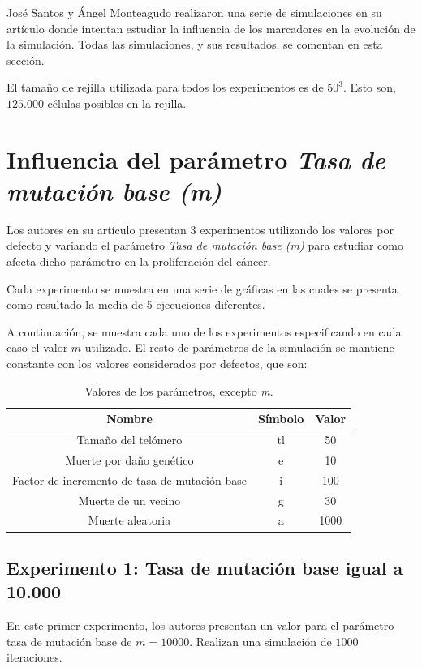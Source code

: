 José Santos y Ángel Monteagudo realizaron una serie de simulaciones en su artículo
donde intentan estudiar la influencia de los marcadores en la evolución de la simulación.
Todas las simulaciones, y sus resultados, se comentan en esta sección.

El tamaño de rejilla utilizada para todos los experimentos es de $50^3$. Esto son,
$125.000$ células posibles en la rejilla.

\section{Influencia del parámetro \textit{Tasa de mutación base (m)}}

Los autores en su artículo presentan 3 experimentos utilizando los valores por defecto
y variando el parámetro \textit{Tasa de mutación base (m)} para estudiar como afecta
dicho parámetro en la proliferación del cáncer.

Cada experimento se muestra en una serie de gráficas en las cuales se presenta
como resultado la media de 5 ejecuciones diferentes.

A continuación, se muestra cada uno de los experimentos especificando en cada caso
el valor $m$ utilizado. El resto de parámetros de la simulación se mantiene constante
con los valores considerados por defectos, que son:

\begin{table}[h!]
  \centering
  \caption{Valores de los parámetros, excepto \textit{m}.}
  \label{tab:table1}
  \begin{tabular}{ccc}
    \toprule
    Nombre & Símbolo & Valor\\
    \midrule
    Tamaño del telómero & tl & 50\\
    Muerte por daño genético & e & 10\\
    Factor de incremento de tasa de mutación base & i & 100\\
    Muerte de un vecino & g & 30\\
    Muerte aleatoria & a & 1000\\
    \bottomrule
  \end{tabular}
\end{table}

\subsection{Experimento 1: Tasa de mutación base igual a 10.000}

En este primer experimento, los autores presentan un valor para el parámetro
tasa de mutación base de $m=10000$. Realizan una simulación de $1000$ iteraciones.

